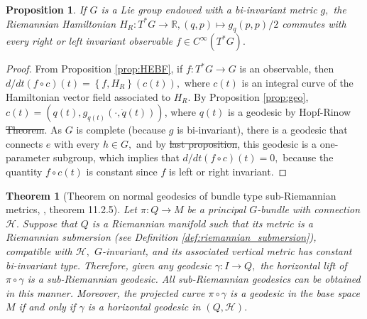 \documentclass[12pt, letterpaper, reqno]{amsart}
\theoremstyle{definition}
\theoremstyle{plain}
\newtheorem{prop}{Proposition}
\newtheorem{thm}{Theorem}
\theoremstyle{remark}
\providecommand{\DIFadd}[1]{{\protect\color{blue}\uwave{#1}}} %
\providecommand{\DIFdel}[1]{{\protect\color{red}\sout{#1}}}                      %
\providecommand{\DIFaddbegin}{} %
\providecommand{\DIFaddend}{} %
\providecommand{\DIFdelbegin}{} %
\providecommand{\DIFdelend}{} %
\newcommand{\DIFscaledelfig}{0.5}
\newlength{\DIFdelgraphicswidth} %
\newlength{\DIFdelgraphicsheight} %
\newcommand{\DIFaddincludegraphics}[2][]{{\color{blue}\fbox{\DIFOincludegraphics[#1]{#2}}}} %
\newcommand{\DIFdelincludegraphics}[2][]{%
\sbox{\DIFdelgraphicsbox}{\DIFOincludegraphics[#1]{#2}}%
\settoboxwidth{\DIFdelgraphicswidth}{\DIFdelgraphicsbox} %
\settoboxtotalheight{\DIFdelgraphicsheight}{\DIFdelgraphicsbox} %
\scalebox{\DIFscaledelfig}{%
\parbox[b]{\DIFdelgraphicswidth}{\usebox{\DIFdelgraphicsbox}\\[-\baselineskip] \rule{\DIFdelgraphicswidth}{0em}}\llap{\resizebox{\DIFdelgraphicswidth}{\DIFdelgraphicsheight}{%
\setlength{\unitlength}{\DIFdelgraphicswidth}%
\begin{picture}(1,1)%
\thicklines\linethickness{2pt} %
{\color[rgb]{1,0,0}\put(0,0){\framebox(1,1){}}}%
{\color[rgb]{1,0,0}\put(0,0){\line( 1,1){1}}}%
{\color[rgb]{1,0,0}\put(0,1){\line(1,-1){1}}}%
\end{picture}%
}\hspace*{3pt}}} %
} %
\DeclareRobustCommand{\DIFaddbegin}{\DIFOaddbegin \let\includegraphics\DIFaddincludegraphics} %
\DeclareRobustCommand{\DIFaddend}{\DIFOaddend \let\includegraphics\DIFOincludegraphics} %
\DeclareRobustCommand{\DIFdelbegin}{\DIFOdelbegin \let\includegraphics\DIFdelincludegraphics} %
\DeclareRobustCommand{\DIFdelend}{\DIFOaddend \let\includegraphics\DIFOincludegraphics} %
\begin{document}
\begin{prop}\label{prop:essential_fact2}
	If $ G $ is a Lie group endowed with a bi-invariant metric $ g, $ the Riemannian Hamiltonian $ H_R : T^*G \rightarrow \mathbb{R}, (q,p) \mapsto g_q(p,p)/2$ commutes with every right or left invariant observable $ f\in C^\infty ( T^*G). $ 
\end{prop}
\begin{proof}
	From Proposition \ref{prop:HEBF}, if $ f: T^*G \rightarrow G $ is an observable, then $ d/dt \left( f\circ c \right) (t)= \left\{ f, H_R \right\}(c(t)),  $ where $ c(t) $ is an integral curve of the Hamiltonian vector field associated to $ H_R. $ By Proposition \ref{prop:geo}, $ c(t)=(q(t), g_{q(t)}(\cdot, \dot{q}(t))) $, where $ q(t) $ is a geodesic by Hopf-Rinow \DIFdelbegin \DIFdel{Theorem}\DIFdelend \DIFaddbegin \DIFadd{theorem}\DIFaddend . As $ G $ is complete (because $ g $ is bi-invariant), there is a geodesic that connects $ e $ with every $ h\in G, $ and by \DIFdelbegin \DIFdel{last proposition}\DIFdelend \DIFaddbegin \DIFadd{Proposition \ref{prop:essential_fact1}}\DIFaddend , this geodesic is a one-parameter subgroup, which implies that $ d/dt(f\circ c)(t)=0, $ because the quantity $ f\circ c(t) $ is constant since $ f $ is left or right invariant.	
\end{proof}

\begin{thm}[Theorem on normal geodesics of bundle type sub-Riemannian metrics, \cite{montgomery2002tour}, theorem 11.2.5]\label{thm:normal_geodesics}
	Let $ \pi: Q \rightarrow M $ be a principal $ G $-bundle with connection $ \mathcal{H}. $ Suppose that $ Q $ is a Riemannian manifold such that its metric is a Riemannian submersion (see Definition \ref{def:riemannian_submersion}), compatible with $ \mathcal{H}, $ $ G $-invariant, and its associated vertical metric has constant bi-invariant type. Therefore, given any geodesic $\gamma: I \rightarrow Q, $ the horizontal lift of $ \pi\circ\gamma $ is a sub-Riemannian geodesic. All sub-Riemannian geodesics can be obtained in this manner. Moreover, the projected curve $ \pi\circ\gamma$ is a geodesic in the base space $ M $ if and only if $ \gamma $ is a horizontal geodesic in $ (Q, \mathcal{H}). $ 
\end{thm}
\end{document}
